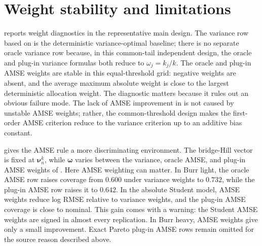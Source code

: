 \begin{table}[htbp]
\centering
\small
\caption{Threshold sensitivity for \(m=10\), strong allocation and \(np=5\).}
\label{tab:sim:threshold}
\begingroup
\setlength{\tabcolsep}{4pt}

\endgroup
\end{table}

\begin{table}[htbp]
\centering
\small
\caption{Target sensitivity for \(m=10\), strong allocation and
\(k_j/n_j=0.05\).}
\label{tab:sim:target}
\begingroup
\setlength{\tabcolsep}{4pt}

\endgroup
\end{table}

\section{Weight stability and limitations}
\label{sec:sim:limitations}

 reports weight diagnostics in the representative main
design. The variance row based on \textcite{DaouiaPadoanStupfler2021} is the
deterministic variance-optimal baseline; there is no separate oracle variance
row because, in this common-tail independent design, the oracle and plug-in
variance formulas both reduce to \(\omega_j=k_j/k\). The oracle and plug-in
AMSE weights are stable in this equal-threshold grid: negative weights are
absent, and the average maximum absolute weight is close to the largest
deterministic allocation weight. The diagnostic matters because it rules out
an obvious failure mode. The lack of AMSE improvement in
 is not caused by unstable AMSE weights; rather, the
common-threshold design makes the first-order AMSE criterion reduce to the
variance criterion up to an additive bias constant.

 gives the AMSE rule a more discriminating
environment. The bridge-Hill vector is fixed at \(\bm\nu_n^k\), while
\(\bm\omega\) varies between the variance, oracle AMSE, and plug-in AMSE
weights of \textcite{DaouiaPadoanStupfler2021}. Here AMSE weighting can
matter. In Burr light, the
oracle AMSE row
raises coverage from \(0.600\) under variance weights to \(0.732\), while the
plug-in AMSE row raises it to \(0.642\). In the absolute Student model, AMSE
weights reduce log RMSE relative to variance weights, and the plug-in AMSE
coverage is close to nominal. This gain comes with a warning: the Student AMSE
weights are signed in almost every replication. In Burr heavy, AMSE weights
give only a small improvement. Exact Pareto plug-in AMSE rows remain omitted
for the source reason described above.

